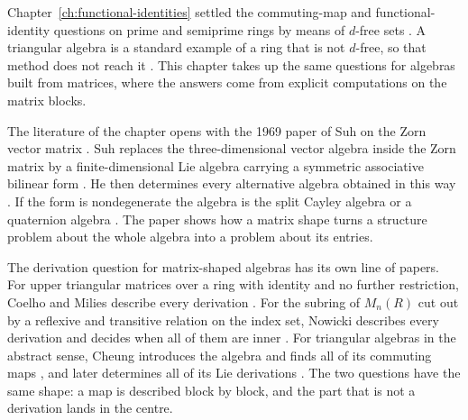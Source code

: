 Chapter~\ref{ch:functional-identities} settled the commuting-map and
functional-identity questions on prime and semiprime rings by means of
$d$-free sets \cite[p.~21]{BresarMartindaleChebotar2007FI}. A triangular
algebra is a standard example of a ring that is not $d$-free, so that method
does not reach it \cite[Section~1]{Benkovic2014}. This chapter takes up the
same questions for algebras built from matrices, where the answers come from
explicit computations on the matrix blocks.

The literature of the chapter opens with the 1969 paper of Suh on the Zorn
vector matrix \cite[p.~255]{Suh1969}. Suh replaces the three-dimensional
vector algebra inside the Zorn matrix by a finite-dimensional Lie algebra
carrying a symmetric associative bilinear form \cite[p.~255]{Suh1969}. He then
determines every alternative algebra obtained in this way
\cite[p.~255]{Suh1969}. If the form is nondegenerate the algebra is the split
Cayley algebra or a quaternion algebra \cite[Theorem~1, p.~257]{Suh1969}. The
paper shows how a matrix shape turns a structure problem about the whole
algebra into a problem about its entries.

The derivation question for matrix-shaped algebras has its own line of papers.
For upper triangular matrices over a ring with identity and no further
restriction, Coelho and Milies describe every derivation
\cite[p.~263]{CoelhoMilies1993}. For the subring of $M_n(R)$ cut out by a
reflexive and transitive relation on the index set, Nowicki describes every
derivation and decides when all of them are inner \cite[Theorem~3.7,
p.~287]{Nowicki1983}. For triangular algebras in the abstract sense, Cheung
introduces the algebra and finds all of its commuting maps
\cite[p.~119]{Cheung2001}, and later determines all of its Lie derivations
\cite[Theorem~11, p.~307]{Cheung2003}. The two questions have the same shape:
a map is described block by block, and the part that is not a derivation lands
in the centre.

